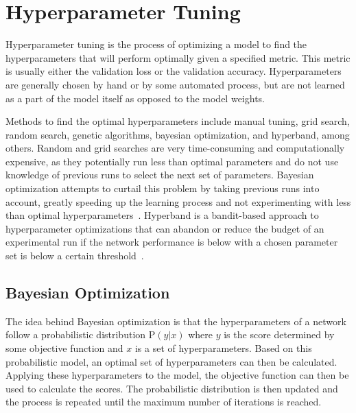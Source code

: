\section{Hyperparameter Tuning}\label{section:background-hyperparameter}
Hyperparameter tuning is the process of optimizing a model to find the hyperparameters that will perform optimally given a specified metric. This metric is usually either the validation loss or the validation accuracy.
Hyperparameters are generally chosen by hand or by some automated process, but are not learned as a part of the model itself as opposed to the model weights.

Methods to find the optimal hyperparameters include manual tuning, grid search, random search, genetic algorithms, bayesian optimization, and hyperband, among others.
Random and grid searches are very time-consuming and computationally expensive, as they potentially run less than optimal parameters and do not use knowledge of previous runs to select the next set of parameters.
Bayesian optimization attempts to curtail this problem by taking previous runs into account, greatly speeding up the learning process and not experimenting with less than optimal hyperparameters~\cite{bayesian}.
Hyperband is a bandit-based approach to hyperparameter optimizations that can abandon or reduce the budget of an experimental run if the network performance is below with a chosen parameter set is below a certain threshold~\cite{hyperband}.

\subsection{Bayesian Optimization}\label{subsection:background-bayesian}
The idea behind Bayesian optimization is that the hyperparameters of a network follow a probabilistic distribution $\text{P}(y | x)$ where $y$ is the score determined by some objective function and $x$ is a set of hyperparameters.
Based on this probabilistic model, an optimal set of hyperparameters can then be calculated.
Applying these hyperparameters to the model, the objective function can then be used to calculate the scores.
The probabilistic distribution is then updated and the process is repeated until the maximum number of iterations is reached.

